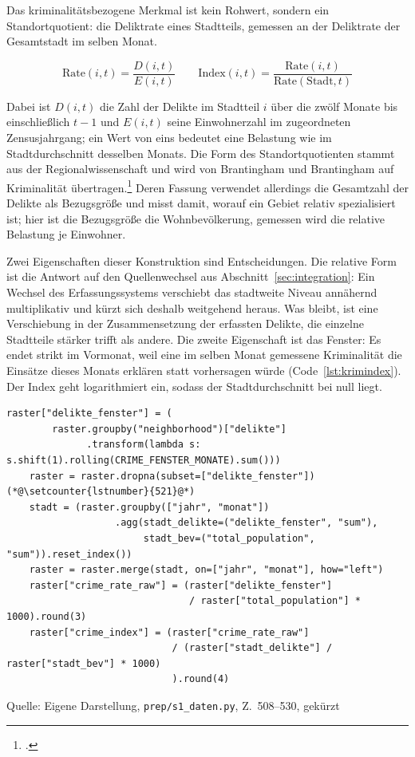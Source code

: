 \documentclass[12pt,a4paper]{article}
\newcommand{\tabquelle}[1][Eigene Darstellung]{%
  \par\setlength{\parskip}{0pt}\vspace{3pt}%
  {\setstretch{1}\fontsize{9pt}{11pt}\selectfont\raggedright Quelle: #1\par}%
}
\begin{document}
Das kriminalitätsbezogene Merkmal ist kein Rohwert, sondern ein
Standortquotient: die Deliktrate eines Stadtteils, gemessen an der Deliktrate
der Gesamtstadt im selben Monat.
 
\begin{equation*}
    \mathrm{Rate}(i,t) = \frac{D(i,t)}{E(i,t)}
    \qquad
    \mathrm{Index}(i,t) = \frac{\mathrm{Rate}(i,t)}{\mathrm{Rate}(\mathrm{Stadt},t)}
\end{equation*}
 
Dabei ist $D(i,t)$ die Zahl der Delikte im Stadtteil $i$ über die zwölf Monate
bis einschließlich $t-1$ und $E(i,t)$ seine Einwohnerzahl im zugeordneten
Zensusjahrgang; ein Wert von eins bedeutet eine Belastung wie im
Stadtdurchschnitt desselben Monats. Die Form des Standortquotienten stammt aus
der Regionalwissenschaft und wird von Brantingham und Brantingham auf
Kriminalität übertragen.\footcite[268-269]{Brantingham1997} Deren Fassung
verwendet allerdings die Gesamtzahl der Delikte als Bezugsgröße und misst
damit, worauf ein Gebiet relativ spezialisiert ist; hier ist die Bezugsgröße
die Wohnbevölkerung, gemessen wird die relative Belastung je Einwohner.
 
Zwei Eigenschaften dieser Konstruktion sind Entscheidungen. Die relative Form
ist die Antwort auf den Quellenwechsel aus Abschnitt~\ref{sec:integration}: Ein
Wechsel des Erfassungssystems verschiebt das stadtweite Niveau annähernd
multiplikativ und kürzt sich deshalb weitgehend heraus. Was bleibt, ist eine
Verschiebung in der Zusammensetzung der erfassten Delikte, die einzelne
Stadtteile stärker trifft als andere. Die zweite Eigenschaft ist das Fenster:
Es endet strikt im Vormonat, weil eine im selben Monat gemessene Kriminalität
die Einsätze dieses Monats erklären statt vorhersagen würde
(Code~\ref{lst:krimindex}). Der Index geht logarithmiert ein, sodass der
Stadtdurchschnitt bei null liegt.
 
\begin{quellcode}[htbp]
\caption{Relativer Kriminalitätsindex je Stadtteil und Monat}
\label{lst:krimindex}\vspace{-3.5pt}
\begin{lstlisting}[style=pythonstil,firstnumber=508]
    raster["delikte_fenster"] = (
        raster.groupby("neighborhood")["delikte"]
              .transform(lambda s: s.shift(1).rolling(CRIME_FENSTER_MONATE).sum()))
    raster = raster.dropna(subset=["delikte_fenster"])(*@\setcounter{lstnumber}{521}@*)
    stadt = (raster.groupby(["jahr", "monat"])
                   .agg(stadt_delikte=("delikte_fenster", "sum"),
                        stadt_bev=("total_population", "sum")).reset_index())
    raster = raster.merge(stadt, on=["jahr", "monat"], how="left")
    raster["crime_rate_raw"] = (raster["delikte_fenster"]
                                / raster["total_population"] * 1000).round(3)
    raster["crime_index"] = (raster["crime_rate_raw"]
                             / (raster["stadt_delikte"] / raster["stadt_bev"] * 1000)
                             ).round(4)
\end{lstlisting}
\tabquelle[Eigene Darstellung, \texttt{prep/s1\_daten.py}, Z.~508--530, gekürzt]
\end{quellcode}
 
\end{document}
